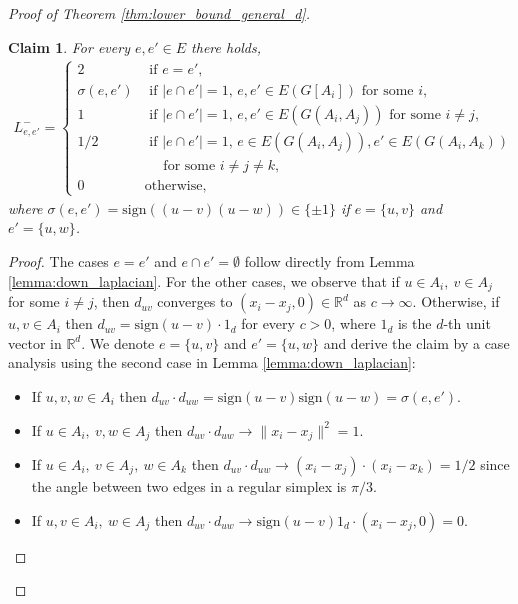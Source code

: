 \documentclass[a4paper,11pt]{article}
\theoremstyle{plain}
\newtheorem{claim}[theorem]{\bf Claim}
\theoremstyle{definition}
\newcommand{\Rea}{{\mathbb R}}
\begin{document}
\begin{proof}[Proof of Theorem \ref{thm:lower_bound_general_d}]
\begin{claim}\label{clm:Lminus}
For every $e,e' \in E$ there holds,
 \begin{align}\label{eq:limit_lap_general_d}
    L^{-}_{e,e'}=\begin{cases}
                    2 & \text{ if }  e=e',\\
                    \sigma(e,e') & \text{ if } |e\cap e'|=1, \, e,e'\in E(G[A_i]) \text{ for some } i,\\
                    1 & \text{ if } |e\cap e'|=1,  \, e,e'\in E(G(A_i,A_j)) \text{ for some } i\neq j,\\
                    1/2 & \text{ if } |e\cap e'|=1,\, e\in E(G(A_i,A_j)),e'\in E(G(A_i,A_k)) \\ & \quad \text{ for some } i\neq j\neq k,\\
                    0 & \text{otherwise},        
    \end{cases}
 \end{align}
where $\sigma(e,e')=\mathrm{sign}((u-v)(u-w))\in\{\pm 1\}$ if $e=\{u,v\}$ and $e'=\{u,w\}$.
\end{claim}
\begin{proof}
The cases $e=e'$ and  $e\cap e'=\emptyset$ follow directly from Lemma \ref{lemma:down_laplacian}. For the other cases, we observe that if $u\in A_i,~v\in A_j$ for some $i\neq j$, then $d_{uv}$ converges to $(x_i-x_j,0)\in\Rea^d$ as $c\to\infty$. Otherwise, if $u,v \in A_i$ then $d_{uv}=\mathrm{sign}(u-v)\cdot 1_d$ for every $c>0$, where $1_d$ is the $d$-th unit vector in $\Rea^d$. We denote $e=\{u,v\}$ and $e'=\{u,w\}$ and derive the claim by a case analysis using the second case in Lemma \ref{lemma:down_laplacian}:
\begin{itemize}
    \item If $u,v,w \in A_i$ then $d_{uv}\cdot d_{uw}=\mathrm{sign}(u-v)\mathrm{sign}(u-w)=\sigma(e,e').$
    \item If $u\in A_i,~ v,w\in A_j$ then $d_{uv}\cdot d_{uw}\to\|x_i-x_j\|^2=1.$
    \item If $u\in A_i,~ v\in A_j,~w\in A_k$ then $d_{uv}\cdot d_{uw}\to(x_i-x_j)\cdot(x_i-x_k)=1/2$ since the angle between two edges in a regular simplex is $\pi/3$.
    \item If $u,v\in A_i,~w\in A_j$ then $d_{uv}\cdot d_{uw}\to \mathrm{sign}(u-v)1_d\cdot(x_i-x_j,0)=0$.
\end{itemize}
\end{proof}


\end{proof}
\end{document}
